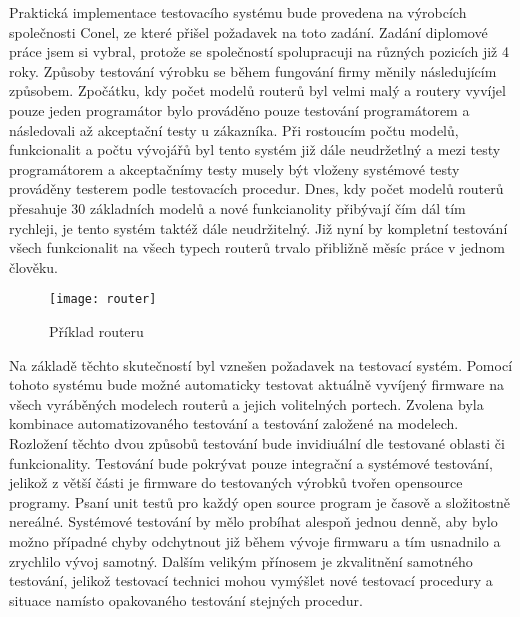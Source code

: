 Praktická implementace testovacího systému bude provedena na výrobcích společnosti Conel, ze které přišel požadavek na toto zadání. Zadání diplomové práce jsem si vybral, protože se společností spolupracuji na různých pozicích již 4 roky. Způsoby testování výrobku se během fungování firmy měnily následujícím způsobem. Zpočátku, kdy počet modelů routerů byl velmi malý a routery vyvíjel pouze jeden programátor bylo prováděno pouze testování programátorem a následovali až akceptační testy u zákazníka. Při rostoucím počtu modelů, funkcionalit a počtu vývojářů byl tento systém již dále neudržetlný a mezi testy programátorem a akceptačnímy testy musely být vloženy systémové testy prováděny testerem podle testovacích procedur. Dnes, kdy počet modelů routerů přesahuje 30 základních modelů a nové funkcianolity přibývají čím dál tím rychleji, je tento systém taktéž dále neudržitelný. Již nyní by kompletní testování všech funkcionalit na všech typech routerů trvalo přibližně měsíc práce v jednom člověku.

\begin{figure}[h]
	\centering
	\texttt{[image: router]}
	\caption{Příklad routeru}
	\label{fig:router}
\end{figure}

Na základě těchto skutečností byl vznešen požadavek na testovací systém. Pomocí tohoto systému bude možné automaticky testovat aktuálně vyvíjený firmware na všech vyráběných modelech routerů a jejich volitelných portech. Zvolena byla kombinace automatizovaného testování a testování založené na modelech. Rozložení těchto dvou způsobů testování bude invidiuální dle testované oblasti či funkcionality. Testování bude pokrývat pouze integrační a systémové testování, jelikož z větší části je firmware do testovaných výrobků tvořen opensource programy. Psaní unit testů pro každý open source program je časově a složitostně nereálné. Systémové testování by mělo probíhat alespoň jednou denně, aby bylo možno případné chyby odchytnout již během vývoje firmwaru a tím usnadnilo a zrychlilo vývoj samotný. Dalším velikým přínosem je zkvalitnění samotného testování, jelikož testovací technici mohou vymýšlet nové testovací procedury a situace namísto opakovaného testování stejných procedur.


